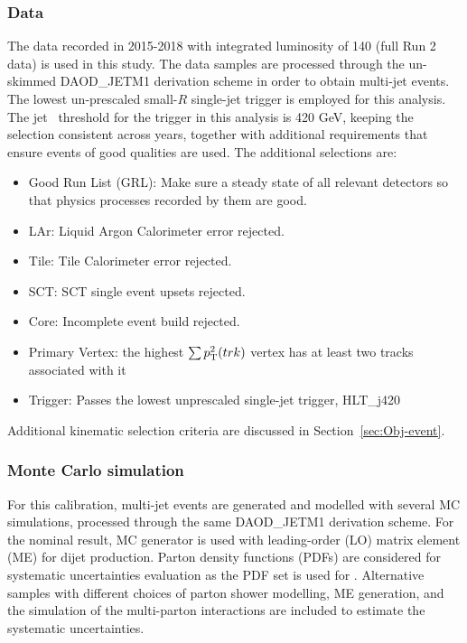 
\subsubsection{Data}
\label{subsec:data}
The data recorded in 2015-2018 with integrated luminosity of 140 \ifb (full Run 2 data) is used in this study. The data samples are processed through the un-skimmed DAOD\_JETM1 derivation scheme in order to obtain multi-jet events. The lowest un-prescaled small-$R$ single-jet trigger is employed for this analysis. The jet \pt~threshold for the trigger in this analysis is 420 GeV, keeping the selection consistent across years, together with additional requirements that ensure events of good qualities are used. The additional selections are:
\begin{itemize}
	\item Good Run List (GRL): Make sure a steady state of all relevant detectors so that physics processes recorded by them are good.
	\item LAr: Liquid Argon Calorimeter error rejected.
	\item Tile: Tile Calorimeter error rejected.
	\item SCT: SCT single event upsets rejected.
	\item Core: Incomplete event build rejected.
	\item Primary Vertex: the highest $\sum p_{\mathrm{T}}^{2}(trk)$ vertex has at least two tracks associated with it
	\item Trigger: Passes the lowest unprescaled single-jet trigger, HLT\_j420
\end{itemize}

Additional kinematic selection criteria are  discussed in Section~\ref{sec:Obj-event}.


\subsubsection{Monte Carlo simulation}
\label{subsec:MC}

For this calibration, multi-jet events are generated and modelled with several MC simulations, processed through the same DAOD\_JETM1 derivation scheme. For the nominal result,  MC generator is used with leading-order (LO) matrix element (ME) for dijet production. Parton density functions (PDFs) are considered for systematic uncertainties evaluation as the \nnpdftwoLO PDF set is used for .  Alternative samples with different choices of parton shower modelling, ME generation,  and the simulation of the multi-parton interactions are included to estimate the systematic uncertainties.

